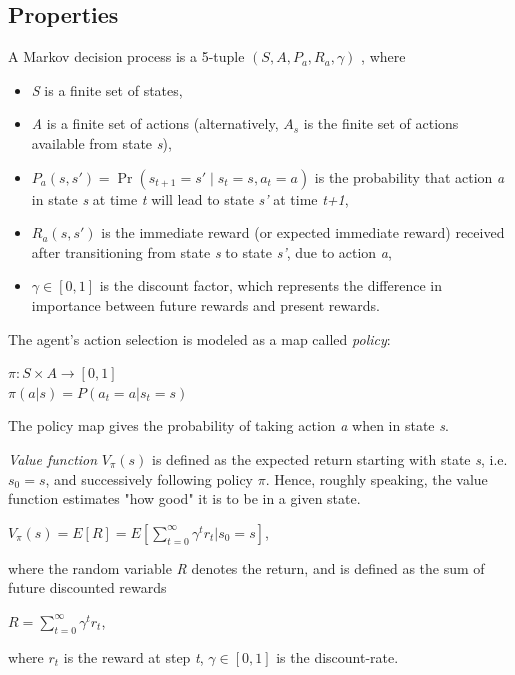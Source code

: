 \documentclass[12pt]{article}
\begin{document}
\subsection{Properties}{
A Markov decision process is a 5-tuple $(S,A,P_{a},R_{a},\gamma )$ \citep{wiki:mdp}, where
\begin{itemize}
\item \textit{S} is a finite set of states,
\item \textit{A} is a finite set of actions (alternatively, $A_s$ is the finite set of actions available from state \textit{s}),
\item $P_{a}(s,s')=\Pr(s_{t+1}=s'\mid s_{t}=s,a_{t}=a)$ is the probability that action \textit{a} in state \textit{s} at time \textit{t} will lead to state \textit{s'} at time \textit{t+1},
\item $R_a(s,s')$ is the immediate reward (or expected immediate reward) received after transitioning from state \textit{s} to state \textit{s'}, due to action \textit{a},
\item $\gamma \in [0,1]$ is the discount factor, which represents the difference in importance between future rewards and present rewards.
\end{itemize}
The agent's action selection is modeled as a map called \textit{policy}:
\begin{center}
$ \pi :S\times A\rightarrow [0,1]$\\
$ \pi (a|s)=P(a_{t}=a|s_{t}=s)$
\end{center}
The policy map gives the probability of taking action \textit{a} when in state \textit{s}.\citep{wiki:mdp} \par
\textit{Value function}  $ V_{\pi }(s)$ is defined as the expected return starting with state \textit{s}, i.e. $s_{0}=s$, and successively following policy $ \pi $. Hence, roughly speaking, the value function estimates "how good" it is to be in a given state.
\begin{center}
$ V_{\pi }(s)=E[R]=\textstyle E[\sum _{t=0}^{\infty }\gamma ^{t}r_{t}|s_{0}=s]$,
\end{center}
where the random variable \textit{R} denotes the return, and is defined as the sum of future discounted rewards
\begin{center}
$ R=\sum _{t=0}^{\infty }\gamma ^{t}r_{t}$,
\end{center}

where $r_{t}$ is the reward at step \textit{t}, $ \gamma \in [0,1]$ is the discount-rate.\citep{wiki:mdp}
}
\end{document}

